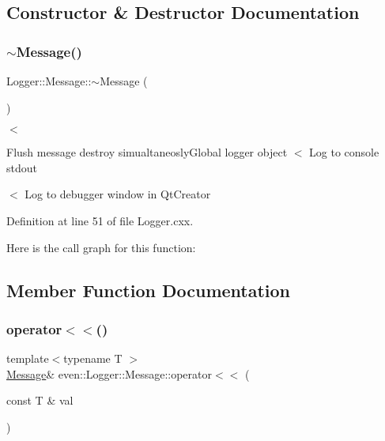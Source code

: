 \subsection{Constructor \& Destructor Documentation}
\mbox{\label{classeven_1_1_logger_1_1_message_ad870fdc45b86b6621da4c21ca4ab30da}} 
\subsubsection{\texorpdfstring{$\sim$\+Message()}{~Message()}}
{\footnotesize\ttfamily Logger\+::\+Message\+::$\sim$\+Message (\begin{DoxyParamCaption}{ }\end{DoxyParamCaption})}



$<$ 

Flush message destroy simualtaneosly\+Global logger object $<$ Log to console stdout

$<$ Log to debugger window in Qt\+Creator 

Definition at line 51 of file Logger.\+cxx.

Here is the call graph for this function\+:


\subsection{Member Function Documentation}
\mbox{\label{classeven_1_1_logger_1_1_message_ae75067bf8787b3ebd7dea6b313e3a958}} 
\subsubsection{\texorpdfstring{operator$<$$<$()}{operator<<()}}
{\footnotesize\ttfamily template$<$typename T $>$ \\
\mbox{\hyperlink{classeven_1_1_logger_1_1_message}{Message}}\& even\+::\+Logger\+::\+Message\+::operator$<$$<$ (\begin{DoxyParamCaption}\item[{const T \&}]{val }\end{DoxyParamCaption})\hspace{0.3cm}{\ttfamily [inline]}}


